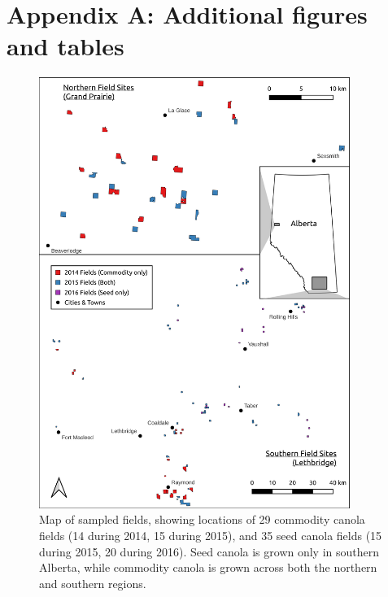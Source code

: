 \documentclass[12pt]{article} %
\begin{document}
\section*{Appendix A: Additional figures and tables}

\begin{figure}[h]
    \centering
    \includegraphics[width=0.9\textwidth,keepaspectratio=true]{FieldLocations.png}
    \caption{Map of sampled fields, showing locations of 29 commodity canola fields (14 during 2014, 15 during 2015), and 35 seed canola fields (15 during 2015, 20 during 2016). Seed canola is grown only in southern Alberta, while commodity canola is grown across both the northern and southern regions.}
\end{figure}
\end{document}
